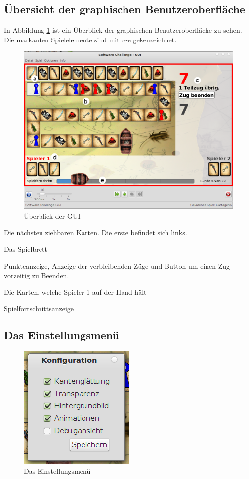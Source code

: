 \documentclass{scrartcl}
\begin{document}
\subsection{Übersicht der graphischen Benutzeroberfläche}
	In Abbildung \ref{fig:GUI} ist ein Überblick der graphischen Benutzeroberfläche
	zu sehen. Die markanten Spielelemente sind mit \emph{a-e} gekenzeichnet.
	 \begin{figure}[h]
		\centering
		\label{fig:GUI}
		\includegraphics[width=\linewidth]{bilder/gui}
		\caption{Überblick der GUI}
	\end{figure}
	
	\begin{compactenum}[a)]
		\item Die nächsten ziehbaren Karten. Die erste befindet sich links.
		\item Das Spielbrett
		\item Punkteanzeige, Anzeige der verbleibenden Züge und Button um einen Zug
		vorzeitig zu Beenden.
		\item Die Karten, welche Spieler 1 auf der Hand hält
		\item Spielfortschrittsanzeige
	\end{compactenum}
	
\subsection{Das Einstellungsmenü}
	 \begin{figure}[h]
		\centering
		\label{fig:Configuration}
		\includegraphics[scale=0.5]{bilder/configuration}
		\caption{Das Einstellungsmenü}
	\end{figure}
	
\end{document}
